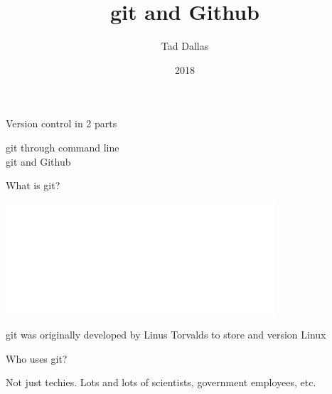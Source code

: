 \documentclass[12pt]{beamer}
\title{\Large git and Github}
\author{Tad Dallas}
\date{2018}
\begin{document}
\maketitle



\begin{frame}

	\begin{flushright}
	{\Large \textcolor{boss2}{Version control in 2 parts}}
	\end{flushright}

	\Huge	
	\textcolor{boss3}{git through command line} \\
	\bigskip
	\bigskip
	\textcolor{boss3}{git and Github} \\

\end{frame}







\begin{frame}

	\begin{flushright}
	{\Large \textcolor{boss2}{What is git?}}
	\end{flushright}
  \includegraphics[width=0.75\textwidth]{figs/Git-Logo-White.png}

\textcolor{boss3}{git was originally developed by Linus Torvalds to store and version Linux}


\end{frame}






\begin{frame}

	\begin{flushright}
	\Large \textcolor{boss2}{Who uses git?} 
	\end{flushright}

\textcolor{boss3}{Not just techies. Lots and lots of scientists, government employees, etc.}

\end{frame}
\end{document}
